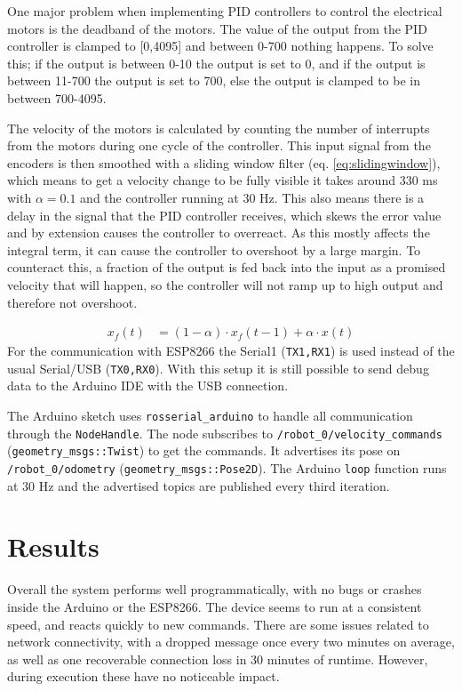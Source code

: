 \documentclass[11pt]{article}
\begin{document}
One major problem when implementing PID controllers to control the electrical
motors is the deadband of the motors. The value of the output from the PID
controller is clamped to [0,4095] and between 0-700 nothing happens. To solve
this; if the output is between 0-10 the output is set to 0, and if the output is
between 11-700 the output is set to 700, else the output is clamped to be in
between 700-4095.\par

The velocity of the motors is calculated by counting the number of interrupts
from the motors during one cycle of the controller. This input signal from the
encoders is then smoothed with a sliding window filter
(eq. \vref{eq:slidingwindow}), which means to get a velocity change to be fully
visible it takes around 330 ms with $\alpha=0.1$ and the controller running at
30 Hz. This also means there is a delay in the signal that the PID controller
receives, which skews the error value and by extension causes the controller to
overreact. As this mostly affects the integral term, it can cause the controller
to overshoot by a large margin. To counteract this, a fraction of the output is
fed back into the input as a promised velocity that will happen, so the
controller will not ramp up to high output and therefore not overshoot.\par

\begin{align}
  x_f(t) &= (1-\alpha) \cdot x_f(t-1)+  \alpha \cdot x(t)  \label{eq:slidingwindow}
\end{align}
For the communication with ESP8266 the Serial1 (\texttt{TX1,RX1}) is used
instead of the usual Serial/USB (\texttt{TX0,RX0}). With this setup it is still
possible to send debug data to the Arduino IDE with the USB connection.\par

The Arduino sketch uses \texttt{rosserial\_arduino} to handle all communication through the \texttt{NodeHandle}. The node subscribes to \texttt{/robot\_0/velocity\_commands}
(\texttt{geometry\_msgs::Twist}) to get the commands. It advertises its pose on
\texttt{/robot\_0/odometry} (\texttt{geometry\_msgs::Pose2D}). The Arduino
\texttt{loop} function runs at 30 Hz and the advertised topics are published
every third iteration.

\section{Results}
Overall the system performs well programmatically, with no bugs or crashes
inside the Arduino or the ESP8266. The device seems to run at a consistent
speed, and reacts quickly to new commands. There are some issues related to
network connectivity, with a dropped message once every two minutes on average,
as well as one recoverable connection loss in 30 minutes of runtime. However,
during execution these have no noticeable impact. \par
\end{document}

